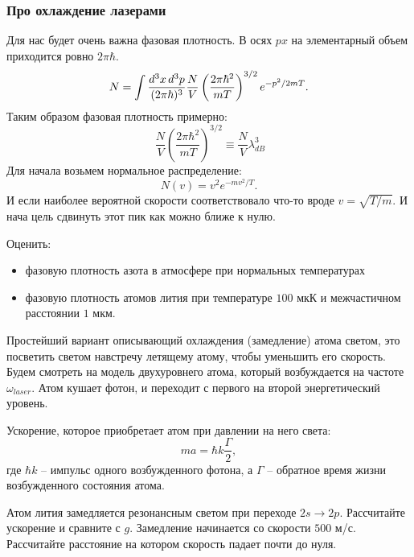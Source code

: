 \subsubsection*{Про охлаждение лазерами}

Для нас будет очень важна фазовая плотность. 
В осях $px$ на элементарный объем приходится ровно $2 \pi \hbar$.
\begin{equation*}
	N = \int \frac{d^3 x \, d^3 p}{(2 \pi \hbar)^3}\frac{N}{V}\left(\frac{2 \pi \hbar^2}{m T}\right)^{3/2} e^{- p^2/2 mT}.
\end{equation*}
Таким образом фазовая плотность примерно:
\begin{equation*}
	~ \frac{N}{V}\left(\frac{2 \pi \hbar^2}{m T}\right)^{3/2} \equiv \frac{N}{V} \lambda_{d B}^3
\end{equation*}
Для начала возьмем нормальное распределение:
\begin{equation*}
	N(v) = v^2 e^{-m v^2/T}.
\end{equation*}
И если наиболее вероятной скорости соответствовало что-то вроде $v =\sqrt{T/m}$. И нача цель сдвинуть этот пик как можно ближе к нулю.

\begin{to_ht}
	Оценить:
	\begin{itemize}
	\item фазовую плотность азота в атмосфере при нормальных температурах
	\item фазовую плотность атомов лития при температуре $100$ мкК и межчастичном расстоянии $1$ мкм.
\end{itemize}	
\end{to_ht}


Простейший вариант описывающий охлаждения (замедление) атома светом, это посветить светом навстречу летящему атому, чтобы уменьшить его скорость.
Будем смотреть на модель двухуровнего атома, который возбуждается на частоте $\omega_{laser}$. Атом кушает фотон, и переходит с первого на второй энергетический уровень.

Ускорение, которое приобретает атом при давлении на него света:
\begin{equation*}
	m a = \hbar k \frac{\Gamma}{2},
\end{equation*}
где $\hbar k$ -- импульс одного возбужденного фотона, а $\Gamma$ -- обратное время жизни возбужденного состояния атома.

\begin{to_ht}
	Атом лития замедляется резонансным светом при переходе $2s \to 2 p$. Рассчитайте ускорение и сравните с $g$. Замедление начинается со скорости $500$ м/с. Рассчитайте расстояние на котором скорость падает почти до нуля.
\end{to_ht}


